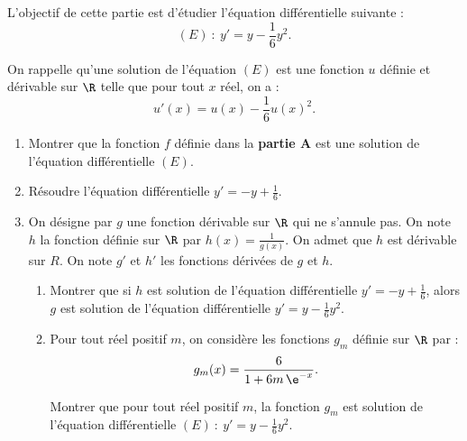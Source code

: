 L'objectif de cette partie est d'étudier l'équation différentielle suivante : \[ (E)~:~y' = y - \frac{1}{6} y^2. \]

On rappelle qu’une solution de l’équation $(E)$ est une fonction $u$ définie et dérivable sur $\R$ telle que pour tout $x$ réel, on a : \[ u'(x) = u(x) - \frac16 u(x)^2. \]

\begin{enumerate}
	\item Montrer que la fonction $f$ définie dans la \textbf{partie A} est une solution de l'équation différentielle $(E)$.
	\item Résoudre l'équation différentielle $y' = -y + \frac{1}{6}$.
	\item On désigne par $g$ une fonction dérivable sur $\R$ qui ne s'annule pas. On note $h$ la fonction définie sur $\R$ par $h(x) = \frac{1}{g(x)}$. On admet que $h$ est dérivable sur $R$. On note $g'$ et $h'$ les fonctions dérivées de $g$ et $h$.
	\begin{enumerate}
		\item Montrer que si $h$ est solution de l'équation différentielle $y' = -y + \frac{1}{6}$, alors $g$ est solution de l'équation différentielle $y' = y - \frac{1}{6} y^2$.
		\item Pour tout réel positif $m$, on considère les fonctions $g_m$ définie sur $\R$ par : \[ g_m(x) = \frac{6}{1 + 6m\,\e^{-x}}. \]
		
		Montrer que pour tout réel positif $m$, la fonction $g_m$ est solution de l'équation différentielle $(E)~:~y' = y - \frac{1}{6} y^2$.
	\end{enumerate}
\end{enumerate}